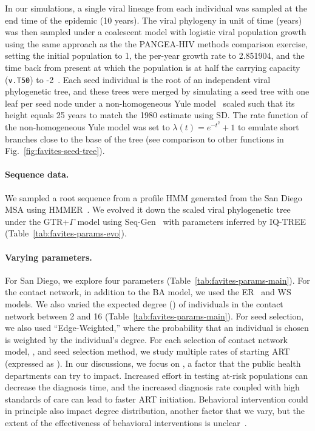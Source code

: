In our simulations, a single viral lineage from each individual was sampled at the end time of the epidemic (10 years). The viral phylogeny in unit of time (years) was then sampled under a coalescent model with logistic viral population growth using the same approach as the the PANGEA-HIV methods comparison exercise, setting the initial population to 1, the per-year growth rate to 2.851904, and the time back from present at which the population is at half the carrying capacity (\texttt{v.T50}) to -2~\cite{Ratmann2017}. Each seed individual is the root of an independent viral phylogenetic tree, and these trees were merged by simulating a seed tree with one leaf per seed node under a non-homogeneous Yule model~\cite{LeGat2016} scaled such that its height equals 25 years to match the 1980 estimate using SD. The rate function of the non-homogeneous Yule model was set to $\lambda(t)=e^{-t^2}+1$ to emulate short branches close to the base of the tree (see comparison to other functions in Fig.~\ref{fig:favites-seed-tree}).

\paragraph{Sequence data.} We sampled a root sequence from a profile \gls{HMM} generated from the San Diego \gls{MSA} using HMMER~\cite{Eddy1998}. We evolved it down the scaled viral phylogenetic tree under the \gls{GTR}+$\Gamma$ model using Seq-Gen~\cite{Rambaut1997} with parameters inferred by IQ-TREE (Table~\ref{tab:favites-params-evo}).

\paragraph{Varying parameters.} For San Diego, we explore four parameters (Table~\ref{tab:favites-params-main}). For the contact network, in addition to the \gls{BA} model, we used the \gls{ER}~\cite{Erdos1960} and \gls{WS}~\cite{Watts1998} models. We also varied the expected degree (\ED) of individuals in the contact network between 2 and 16 (Table~\ref{tab:favites-params-main}). For seed selection, we also used ``Edge-Weighted,'' where the probability that an individual is chosen is weighted by the individual's degree. For each selection of contact network model, \ED, and seed selection method, we study multiple rates of starting ART (expressed as \EART). In our discussions, we focus on \EART, a factor that the public health departments can try to impact. Increased effort in testing at-risk populations can decrease the diagnosis time, and the increased diagnosis rate coupled with high standards of care can lead to faster ART initiation. Behavioral intervention could in principle also impact degree distribution, another factor that we vary, but the extent of the effectiveness of behavioral interventions is unclear~\cite{Kelly1991}.

